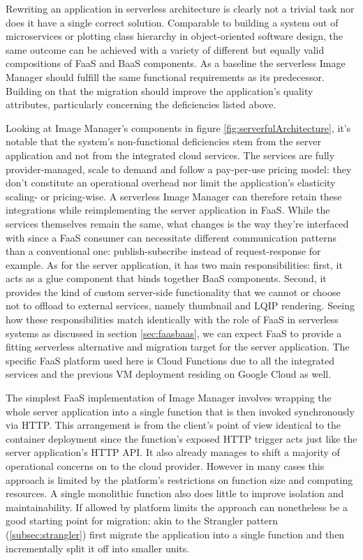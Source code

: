 Rewriting an application in serverless architecture is clearly not a trivial task nor does it have a single correct solution. Comparable to building a system out of microservices or plotting class hierarchy in object-oriented software design, the same outcome can be achieved with a variety of different but equally valid compositions of FaaS and BaaS components. As a baseline the serverless Image Manager should fulfill the same functional requirements as its predecessor. Building on that the migration should improve the application's quality attributes, particularly concerning the deficiencies listed above.

Looking at Image Manager's components in figure \ref{fig:serverfulArchitecture}, it's notable that the system's non-functional deficiencies stem from the server application and not from the integrated cloud services. The services are fully provider-managed, scale to demand and follow a pay-per-use pricing model: they don't constitute an operational overhead nor limit the application's elasticity scaling- or pricing-wise. A serverless Image Manager can therefore retain these integrations while reimplementing the server application in FaaS. While the services themselves remain the same, what changes is the way they're interfaced with since a FaaS consumer can necessitate different communication patterns than a conventional one: publish-subscribe instead of request-response for example. As for the server application, it has two main responsibilities: first, it acts as a glue component that binds together BaaS components. Second, it provides the kind of custom server-side functionality that we cannot or choose not to offload to external services, namely thumbnail and LQIP rendering. Seeing how these responsibilities match identically with the role of FaaS in serverless systems as discussed in section \ref{sec:faasbaas}, we can expect FaaS to provide a fitting serverless alternative and migration target for the server application. The specific FaaS platform used here is Cloud Functions \parencite{google18cloudFunctions} due to all the integrated services and the previous VM deployment residing on Google Cloud as well.

The simplest FaaS implementation of Image Manager involves wrapping the whole server application into a single function that is then invoked synchronously via HTTP. This arrangement is from the client's point of view identical to the container deployment since the function's exposed HTTP trigger acts just like the server application's HTTP API. It also already manages to shift a majority of operational concerns on to the cloud provider. However in many cases this approach is limited by the platform's restrictions on function size and computing resources. A single monolithic function also does little to improve isolation and maintainability. If allowed by platform limits the approach can nonetheless be a good starting point for migration: akin to the Strangler pattern (\ref{subsec:strangler}) first migrate the application into a single function and then incrementally split it off into smaller units.

